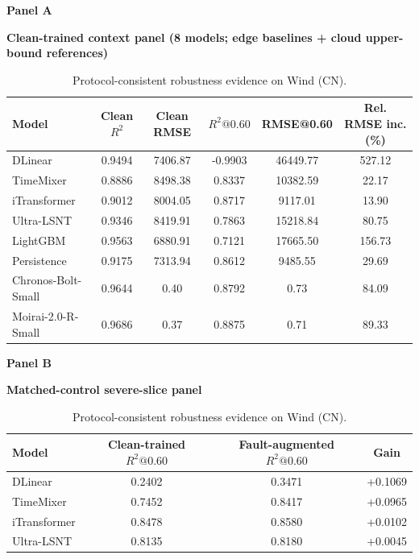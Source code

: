 \documentclass[review,1p,times]{elsarticle}
\newcommand{\aePanelHeading}[2]{%
  \par\vspace{2pt}%
  \noindent\begin{minipage}{\linewidth}
    \centering
    \textbf{#1}\par
    \textbf{#2}\par
  \end{minipage}%
  \par\vspace{2pt}%
}
\begin{document}
\begin{table}[t]
\centering
\caption{Protocol-consistent robustness evidence on Wind (CN).}
\label{tab:table2_comprehensive}
\label{tab:main4_perf_robust_transfer}
\label{tab:main_wind_cn}
\label{tab:master_robustness}
\footnotesize
\setlength{\tabcolsep}{4pt}
\aePanelHeading{Panel A}{Clean-trained context panel (8 models; edge baselines + cloud upper-bound references)}
\begin{tabular*}{\linewidth}{@{\extracolsep{\fill}}lccccc@{}}
\toprule
\textbf{Model} & \textbf{Clean $R^2$} & \textbf{Clean RMSE} & \textbf{$R^2@0.60$} & \textbf{RMSE@0.60} & \textbf{Rel. RMSE inc. (\%)} \\
\midrule
DLinear & 0.9494 & 7406.87 & -0.9903 & 46449.77 & 527.12 \\
TimeMixer & 0.8886 & 8498.38 & 0.8337 & 10382.59 & 22.17 \\
iTransformer & 0.9012 & 8004.05 & 0.8717 & 9117.01 & 13.90 \\
Ultra-LSNT & 0.9346 & 8419.91 & 0.7863 & 15218.84 & 80.75 \\
LightGBM & 0.9563 & 6880.91 & 0.7121 & 17665.50 & 156.73 \\
Persistence & 0.9175 & 7313.94 & 0.8612 & 9485.55 & 29.69 \\
Chronos-Bolt-Small & 0.9644 & 0.40 & 0.8792 & 0.73 & 84.09 \\
Moirai-2.0-R-Small & 0.9686 & 0.37 & 0.8875 & 0.71 & 89.33 \\
\bottomrule
\end{tabular*}
\vspace{4pt}
\aePanelHeading{Panel B}{Matched-control severe-slice panel}
\begin{tabular*}{0.92\linewidth}{@{\extracolsep{\fill}}lccc@{}}
\toprule
\textbf{Model} & \textbf{Clean-trained $R^2@0.60$} & \textbf{Fault-augmented $R^2@0.60$} & \textbf{Gain} \\
\midrule
DLinear & 0.2402 & 0.3471 & +0.1069 \\
TimeMixer & 0.7452 & 0.8417 & +0.0965 \\
iTransformer & 0.8478 & 0.8580 & +0.0102 \\
Ultra-LSNT & 0.8135 & 0.8180 & +0.0045 \\
\bottomrule
\end{tabular*}

\end{table}
\end{document}
